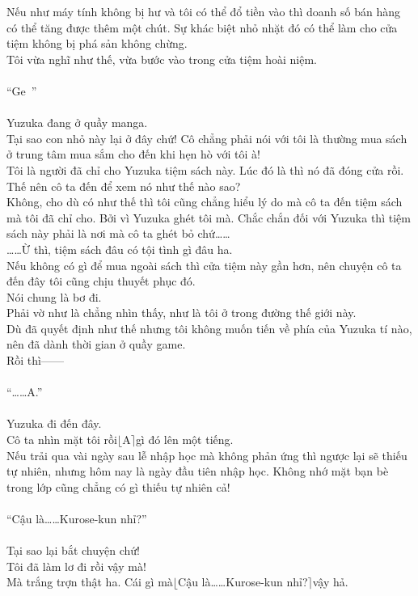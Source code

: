 \documentclass[12pt,a4paper, twosides]{book}
\begin{document}
Nếu như máy tính không bị hư và tôi có thể đổ tiền vào thì doanh số bán hàng có thể tăng được thêm một chút. Sự khác biệt nhỏ nhặt đó có thể làm cho cửa tiệm không bị phá sản không chừng.\\
Tôi vừa nghĩ như thế, vừa bước vào trong cửa tiệm hoài niệm.\\
\\
“Ge~”\\
\\
Yuzuka đang ở quầy manga.\\
Tại sao con nhỏ này lại ở đây chứ! Cô chẳng phải nói với tôi là thường mua sách ở trung tâm mua sắm cho đến khi hẹn hò với tôi à!\\
Tôi là người đã chỉ cho Yuzuka tiệm sách này. Lúc đó là thì nó đã đóng cửa rồi. Thế nên cô ta đến để xem nó như thế nào sao?\\
Không, cho dù có như thế thì tôi cũng chẳng hiểu lý do mà cô ta đến tiệm sách mà tôi đã chỉ cho. Bởi vì Yuzuka ghét tôi mà. Chắc chắn đối với Yuzuka thì tiệm sách này phải là nơi mà cô ta ghét bỏ chứ……\\
……Ừ thì, tiệm sách đâu có tội tình gì đâu ha.\\
Nếu không có gì để mua ngoài sách thì cửa tiệm này gần hơn, nên chuyện cô ta đến đây tôi cũng chịu thuyết phục đó.\\
Nói chung là bơ đi.\\
Phải vờ như là chẳng nhìn thấy, như là tôi ở trong đường thế giới này.\\
Dù đã quyết định như thế nhưng tôi không muốn tiến về phía của Yuzuka tí nào, nên đã dành thời gian ở quầy game.\\
Rồi thì——\\
\\
“……A.”\\
\\
Yuzuka đi đến đây.\\
Cô ta nhìn mặt tôi rồi$\lfloor$A$\rceil$gì đó lên một tiếng.\\
Nếu trải qua vài ngày sau lễ nhập học mà không phản ứng thì ngược lại sẽ thiếu tự nhiên, nhưng hôm nay là ngày đầu tiên nhập học. Không nhớ mặt bạn bè trong lớp cũng chẳng có gì thiếu tự nhiên cả!\\
\\
“Cậu là……Kurose-kun nhỉ?”\\
\\
Tại sao lại bắt chuyện chứ!\\
Tôi đã làm lơ đi rồi vậy mà!\\
Mà trắng trợn thật ha. Cái gì mà$\lfloor$Cậu là……Kurose-kun nhỉ?$\rceil$vậy hả.\\
\end{document}
